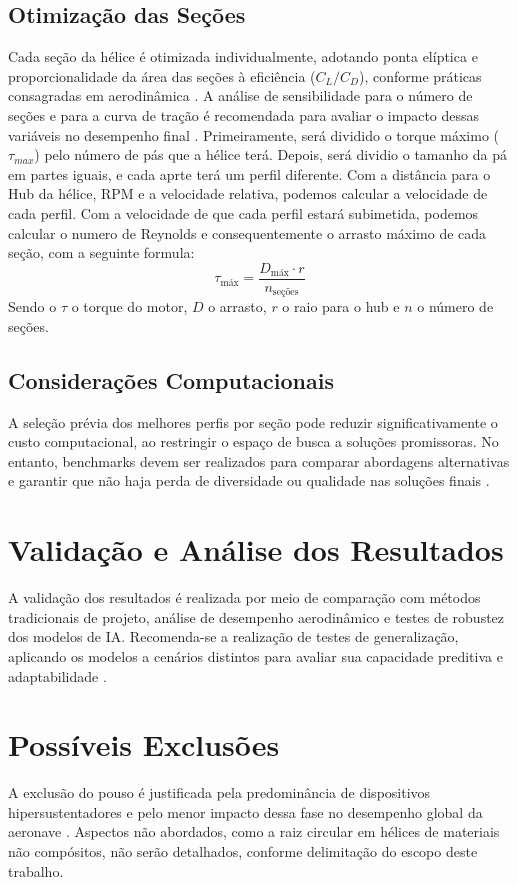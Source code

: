 \subsection{Otimização das Seções}
Cada seção da hélice é otimizada individualmente, adotando ponta elíptica e proporcionalidade da área das seções à eficiência (\(C_L/C_D\)), conforme práticas consagradas em aerodinâmica \cite{anderson2017fundamentals, abbott1959theory}. A análise de sensibilidade para o número de seções e para a curva de tração é recomendada para avaliar o impacto dessas variáveis no desempenho final \cite{wu2024}. Primeiramente, será dividido o torque máximo ($\tau_{max}$) pelo número de pás que a hélice terá. Depois, será dividio o tamanho da pá em partes iguais, e cada aprte terá um perfil diferente. Com a distância para o Hub da hélice, RPM e a velocidade relativa, podemos calcular a velocidade de cada perfil. Com a velocidade de que cada perfil estará subimetida, podemos calcular o numero de Reynolds e consequentemente o arrasto máximo de cada seção, com a seguinte formula:
\[
    \tau_{\text{máx}} = \frac{D_{\text{máx}}\cdot r}{n_{\text{seções}}} 
\]
Sendo o $\tau$ o torque do motor, $D$ o arrasto, $r$ o raio para o hub e $n$ o número de seções.

\subsection{Considerações Computacionais}
A seleção prévia dos melhores perfis por seção pode reduzir significativamente o custo computacional, ao restringir o espaço de busca a soluções promissoras. No entanto, benchmarks devem ser realizados para comparar abordagens alternativas e garantir que não haja perda de diversidade ou qualidade nas soluções finais \cite{oliveira2023, hasan2024}.

\section{Validação e Análise dos Resultados}
A validação dos resultados é realizada por meio de comparação com métodos tradicionais de projeto, análise de desempenho aerodinâmico e testes de robustez dos modelos de IA. Recomenda-se a realização de testes de generalização, aplicando os modelos a cenários distintos para avaliar sua capacidade preditiva e adaptabilidade \cite{hasan2024, wu2024, goodfellow2016deep}.

\section{Possíveis Exclusões}
A exclusão do pouso é justificada pela predominância de dispositivos hipersustentadores e pelo menor impacto dessa fase no desempenho global da aeronave \cite{raymer2018aircraft, abbott1959theory}. Aspectos não abordados, como a raiz circular em hélices de materiais não compósitos, não serão detalhados, conforme delimitação do escopo deste trabalho.

